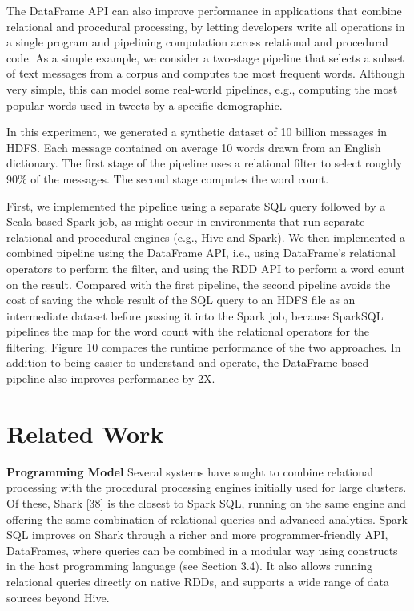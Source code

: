 \documentclass[runningheads,a4paper]{llncs}
\begin{document}
The DataFrame API can also improve performance in applications that combine relational and procedural processing, by letting developers write all operations in a single program and pipelining computation across relational and procedural code. As a simple example, we consider a two-stage pipeline that selects a subset of text messages from a corpus and computes the most frequent words. Although very simple, this can model some real-world pipelines, e.g., computing the most popular words used in tweets by a specific demographic.

In this experiment, we generated a synthetic dataset of 10 billion messages in HDFS. Each message contained on average 10 words drawn from an English dictionary. The first stage of the pipeline uses a relational filter to select roughly 90\% of the messages. The second stage computes the word count.

First, we implemented the pipeline using a separate SQL query followed by a Scala-based Spark job, as might occur in environments that run separate relational and procedural engines (e.g., Hive and Spark). We then implemented a combined pipeline using the DataFrame API, i.e., using DataFrame’s relational operators to perform the filter, and using the RDD API to perform a word count on the result. Compared with the first pipeline, the second pipeline avoids the cost of saving the whole result of the SQL query to an HDFS file as an intermediate dataset before passing it into the Spark job, because SparkSQL pipelines the map for the word count with the relational operators for the filtering. Figure 10 compares the runtime performance of the two approaches. In addition to being easier to understand and operate, the DataFrame-based pipeline also improves performance by 2X.

\section{Related Work}

\textbf{Programming Model} Several systems have sought to combine relational processing with the procedural processing engines initially used for large clusters. Of these, Shark [38] is the closest to Spark SQL, running on the same engine and offering the same combination of relational queries and advanced analytics. Spark SQL improves on Shark through a richer and more programmer-friendly API, DataFrames, where queries can be combined in a modular
way using constructs in the host programming language (see Section 3.4). It also allows running relational queries directly on native RDDs, and supports a wide range of data sources beyond Hive.
\end{document}
